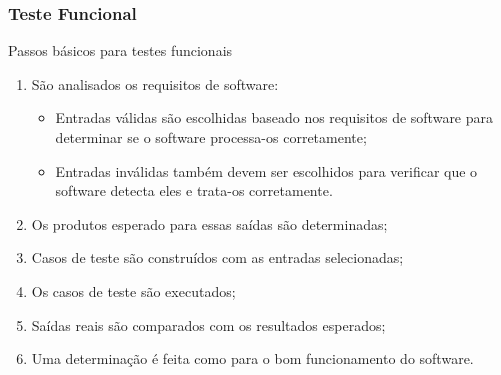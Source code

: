 \begin{frame}[hasprev=true, hasnext=false]
\frametitle{Teste Funcional}

\begin{block:procedure}{Passos básicos para testes funcionais}
\begin{enumerate}
	\item São analisados os requisitos de software:
	\begin{itemize}
		\item Entradas válidas são escolhidas baseado nos requisitos de software
		para determinar se o software processa-os corretamente;

		\item Entradas inválidas também devem ser escolhidos para verificar que o software
		detecta eles e trata-os corretamente.
	\end{itemize}

	\item Os produtos esperado para essas saídas são determinadas;

	\item Casos de teste são construídos com as entradas selecionadas;

	\item Os casos de teste são executados;

	\item Saídas reais são comparados com os resultados esperados;

	\item Uma determinação é feita como para o bom funcionamento do software.
\end{enumerate}
\end{block:procedure}
\end{frame}
